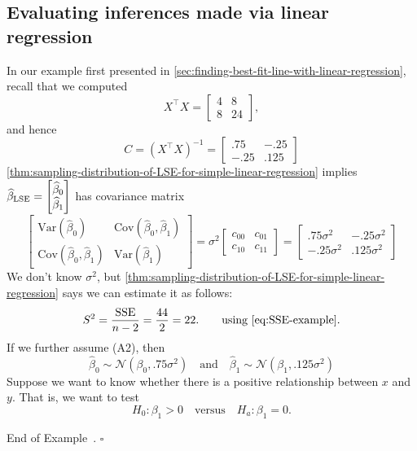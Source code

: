 \documentclass[10pt]{article}
\theoremstyle{definition}
\newtheorem{example}[theorem]{Example}
\renewenvironment{example}
{\begin{oldexample}}
  {\par\smallskip\hfill   End of Example~\theexample. $\square$    \par\end{oldexample}}
\newcommand{\1}[1]{\textbf{1}_{\left[#1\right]}} %
\def\Var{\mathrm{Var}} %
\def\Cov{\mathrm{Cov}} %
\begin{document}
\subsection{Evaluating inferences made via linear regression}
\begin{example}
  In our example first presented in \cref{sec:finding-best-fit-line-with-linear-regression}, recall that we computed
  \begin{equation*}
    X^{\top}X =
    \begin{bmatrix}
      4&8\\
      8&24
    \end{bmatrix},
  \end{equation*}
  and hence
  \begin{equation*}
    C =
   (X^{\top}X)^{-1}=
    \begin{bmatrix}
      .75 & -.25\\
      -.25& .125
    \end{bmatrix}
  \end{equation*}
  \cref{thm:sampling-distribution-of-LSE-for-simple-linear-regression} implies
   $\widehat{\beta}_{\rm LSE}=\begin{bmatrix} 
    \widehat{\beta}_{0}\\
    \widehat{\beta}_{1}
  \end{bmatrix}$
  has covariance matrix
  \begin{equation*}
    \begin{bmatrix}
      \Var(\widehat{\beta}_{0})& \Cov(\widehat{\beta}_{0},\widehat{\beta}_{1})\\
      \Cov(\widehat{\beta}_{0},\widehat{\beta}_{1})& \Var(\widehat{\beta}_{1})
    \end{bmatrix}
    = \sigma^{2}
    \begin{bmatrix}
      c_{00}&c_{01}\\
      c_{10}&c_{11}
    \end{bmatrix}=
    \begin{bmatrix}
      .75\sigma^{2} & -.25\sigma^{2}\\
      -.25\sigma^{2}& .125\sigma^{2}
    \end{bmatrix}
  \end{equation*}  
  We don't know $\sigma^{2}$, but
  \cref{thm:sampling-distribution-of-LSE-for-simple-linear-regression} says we
  can estimate it as follows:
  \begin{equation*}
    S^{2}
    = \frac{\mathrm{SSE}}{n-2} 
    = \frac{44}{2} = 22.
    \quad \quad\text{using \cref{eq:SSE-example}.}
  \end{equation*}
  If we further assume (A2), then
  \begin{equation*}
    \widehat{\beta}_{0}\sim \mathcal{N}(\beta_{0}, .75\sigma^{2})
    \quad \text{and} \quad 
    \widehat{\beta}_{1}\sim \mathcal{N}(\beta_{1}, .125\sigma^{2})
  \end{equation*}
  Suppose we want to know whether there is a positive relationship between $x$
  and $y$. That is, we want to test
  \begin{equation*}
    H_{0}: \beta_{1}>0
    \quad \text{versus} \quad
    H_{a}: \beta_{1}=0.
  \end{equation*}
  

\end{example}
\end{document}

